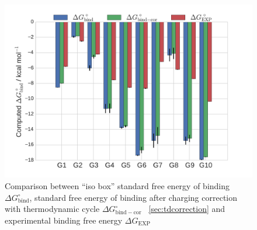 \documentclass[11pt,oneside,a4paper]{article}
\begin{document}
\begin{figure}[h!]
\caption{Comparison between ``iso box'' standard free energy of binding $\Delta G_\mathrm{bind}^\circ$, standard free energy of binding after charging correction with thermodynamic cycle $\Delta G_\mathrm{bind-cor}^\circ$ ~\ref{sec:tdcorrection} and experimental binding free energy $\Delta G_\mathrm{EXP}$ \label{fig:fig4}}
 \includegraphics[width=\textwidth]{figures/Fig4.pdf}
 \centering
\end{figure}



\newpage


{}
\end{document}
